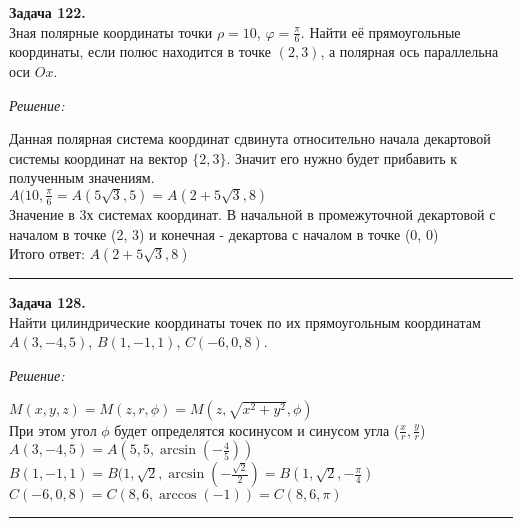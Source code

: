 \documentclass[a4paper, 12pt]{article}
\newenvironment{problem}[2][Задача]
    { \begin{mdframed}[backgroundcolor=gray!10] \textbf{#1 #2.} \\}
    {  \end{mdframed}}
\newenvironment{solution}
    {\textit{Решение: }}
    {\noindent\rule{7in}{1.5pt}}
\begin{document}
\begin{problem}{122}
Зная полярные координаты точки $\rho = 10$, $\varphi = \frac{\pi}{6}$. Найти её прямоугольные координаты, если полюс
находится в точке $(2,3)$, а полярная ось параллельна оси $Ox$.
\end{problem}
\begin{solution}

Данная полярная система координат сдвинута относительно начала декартовой системы координат на вектор $\{2, 3\}$.
Значит его нужно будет прибавить к полученным значениям. \\
$A(10, \frac{\pi}{6} = A(5\sqrt{3}, 5) = A(2 + 5\sqrt{3}, 8)$ \\
Значение в 3х системах координат. В начальной в промежуточной декартовой с началом в точке (2, 3) и конечная - декартова с началом в точке (0, 0) \\
Итого ответ: $A(2 + 5\sqrt{3}, 8)$

\end{solution}

\begin{problem}{128}
Найти цилиндрические координаты точек по их прямоугольным координатам $A(3, -4, 5)$, $B(1, -1, 1)$, $C(-6, 0, 8)$.
\end{problem}
\begin{solution}

$M(x, y, z) = M(z, r, \phi) = M(z, \sqrt{x^2 + y^2}, \phi)$ \\
При этом угол $\phi$ будет определятся косинусом и синусом угла ($\frac{x}{r}, \frac{y}{r}$) \\
$A(3, -4, 5) = A(5, 5, \arcsin(-\frac{4}{5}))$ \\
$B(1, -1, 1) = B(1, \sqrt{2}, \arcsin(-\frac{\sqrt{2}}{2}) = B(1, \sqrt{2}, -\frac{\pi}{4})$ \\
$C(-6, 0, 8) = C(8, 6, \arccos(-1)) = C(8, 6, \pi)$

\end{solution}
\end{document}
